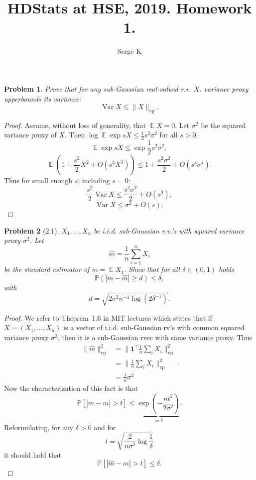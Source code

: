 \documentclass{article}
\title{HDStats at HSE, 2019. Homework 1.}
\author{Serge K}
\newtheorem{problem}{Problem}
\newcommand{\expect}{\operatorname{\mathbb{E}}}
\begin{document}
\maketitle

\begin{problem}
    Prove that
    for any sub-Gaussian real-valued r.v. \( X \).
    variance proxy upperbounds its variance:
    \[
        \operatorname{Var}X \leq \|X\|_{\mathrm{vp}}.
    \]
\end{problem}
\begin{proof}
    Assume, without loss of generality, that \( \expect X = 0\).
    Let \( \sigma^2 \) be the squared variance proxy of \( X \).
    Then \( \log \expect \exp sX \leq \frac12 s^2 \sigma^2 \)
    for all \( s > 0 \).
    \[
        \expect\exp sX \leq \exp \frac12 s^2 \sigma^2,
    \]
    \[
        \expect\left(1 + \frac{s^2}{2} X^2 + O(s^3X^3)\right)
        \leq 1 + \frac{s^2\sigma^2}{2} + O(s^4\sigma^4).
    \]
    Thus for small enough \( s \), including \( s=0 \):
    \[
        \frac{s^2}{2}\operatorname{Var}{X} \leq \frac{s^2\sigma^2}{2} + O(s^3),
    \]
    \[
        \operatorname{Var}{X} \leq \sigma^2 + O(s),
    \]
\end{proof}

\begin{problem}[2.1]
    \( X_1, \ldots, X_n \) be i.i.d. sub-Gaussian r.v.'s with squared variance proxy \( \sigma^2 \).
    Let
    \[
        \hat{m} = \frac1n \sum_{i=1}^n X_i
    \]
    be the standard estimator of \( m = \expect X_1 \).
    Show that for all \( \delta\in(0,1) \)
    holds
    \[
        \mathbb{P}\left(|m - \hat{m}| \geq d\right) \leq \delta,
    \]
    with
    \[
            d= \sqrt{2\sigma^2 n^{-1} \log(2\delta^{-1})}.
    \]
\end{problem}
\begin{proof}
We refer to \textrm{Theorem~1.6} in MIT lectures
which states that if \( X=(X_1, \ldots, X_n) \)
is a vector of i.i.d. sub-Gaussian rv's with
common squared variance proxy \( \sigma^2 \),
then it is a sub-Gaussian rvec with same variance proxy.
Thus \[\begin{split}
 \|\hat{m}\|_{\textrm{vp}}^2
 & = \|\mathbf{1}^\top \frac1n\sum_i X_i\|_{\textrm{vp}}^2 \\
 & = \|\frac1n\sum_i X_i\|_{\textrm{vp}}^2 \\
 & = \frac1n \sigma^2 \end{split}.\]
Now the characterization of this fact is that
\[
\mathbb{P}\left[|\hat{m} - m| > t\right]
\leq \underbrace{\exp(-\frac{nt^2}{2\sigma^2})}_{=\delta}.
\]
Reformulating, for any \( \delta > 0 \) and for
\[ t = \sqrt{
\frac{2}{n\sigma^2}\log\frac{1}{\delta}
} \]
it should hold that
\[ \mathbb{P}[|\hat{m} - m| > t] \leq \delta. \]
\end{proof}
\end{document}
